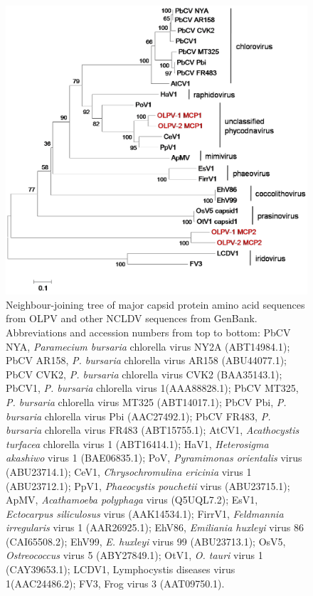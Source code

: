 \begin{figure}
\includegraphics[width=\textwidth]{olv_figures/OLPV_full_mcp.jpg}
\caption[Phylogeny of \acs{OLPV} major capsid protein sequences]{Neighbour-joining tree of major capsid protein amino acid sequences from \ac{OLPV} and  other \acs{NCLDV} sequences from GenBank. 
Abbreviations and accession numbers from top to bottom: PbCV NYA, \emph{Paramecium bursaria} chlorella virus NY2A (ABT14984.1); PbCV AR158, \emph{P. bursaria} chlorella virus AR158 (ABU44077.1); PbCV CVK2, \emph{P. bursaria} chlorella virus CVK2 (BAA35143.1); PbCV1, \emph{P. bursaria} chlorella virus 1(AAA88828.1); PbCV MT325, \emph{P. bursaria} chlorella virus MT325 (ABT14017.1); PbCV Pbi, \emph{P. bursaria} chlorella virus Pbi (AAC27492.1); PbCV FR483, \emph{P. bursaria} chlorella virus FR483 (ABT15755.1); AtCV1, \emph{Acathocystis turfacea} chlorella virus 1 (ABT16414.1); HaV1, \emph{Heterosigma akashiwo} virus 1 (BAE06835.1); PoV, \emph{Pyramimonas orientalis} virus (ABU23714.1); CeV1, \emph{Chrysochromulina ericinia} virus 1 (ABU23712.1); PpV1, \emph{Phaeocystis pouchetii} virus (ABU23715.1); ApMV, \emph{Acathamoeba polyphaga} virus (Q5UQL7.2); EsV1, \emph{Ectocarpus siliculosus} virus (AAK14534.1); FirrV1, \emph{Feldmannia irregularis} virus 1 (AAR26925.1); EhV86, \emph{Emiliania huxleyi} virus 86 (CAI65508.2); EhV99, \emph{E. huxleyi} virus 99 (ABU23713.1); OsV5, \emph{Ostreococcus} virus 5 (ABY27849.1); OtV1, \emph{O. tauri} virus 1 (CAY39653.1); LCDV1, Lymphocystis diseases virus 1(AAC24486.2); FV3, Frog virus 3 (AAT09750.1). 
}
\label{fig:OLPV_full_mcp}

\end{figure}
